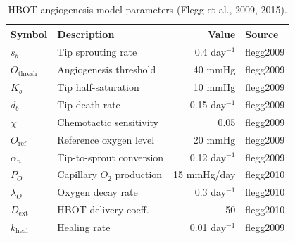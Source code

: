 \documentclass[11pt,a4paper]{article}
\begin{document}
\begin{table}[h]
\centering
\caption{HBOT angiogenesis model parameters (Flegg et al., 2009, 2015).}
\begin{tabular}{@{}llrl@{}}
\toprule
Symbol & Description & Value & Source \\
\midrule
$s_b$ & Tip sprouting rate & 0.4 day$^{-1}$ & flegg2009 \\
$O_{\text{thresh}}$ & Angiogenesis threshold & 40 mmHg & flegg2009 \\
$K_b$ & Tip half-saturation & 10 mmHg & flegg2009 \\
$d_b$ & Tip death rate & 0.15 day$^{-1}$ & flegg2009 \\
$\chi$ & Chemotactic sensitivity & 0.05 & flegg2009 \\
$O_{\text{ref}}$ & Reference oxygen level & 20 mmHg & flegg2009 \\
$\alpha_n$ & Tip-to-sprout conversion & 0.12 day$^{-1}$ & flegg2009 \\
$P_O$ & Capillary $O_2$ production & 15 mmHg/day & flegg2010 \\
$\lambda_O$ & Oxygen decay rate & 0.3 day$^{-1}$ & flegg2010 \\
$D_{\text{ext}}$ & HBOT delivery coeff. & 50 & flegg2010 \\
$k_{\text{heal}}$ & Healing rate & 0.01 day$^{-1}$ & flegg2009 \\
\bottomrule
\end{tabular}
\end{table}
\end{document}
